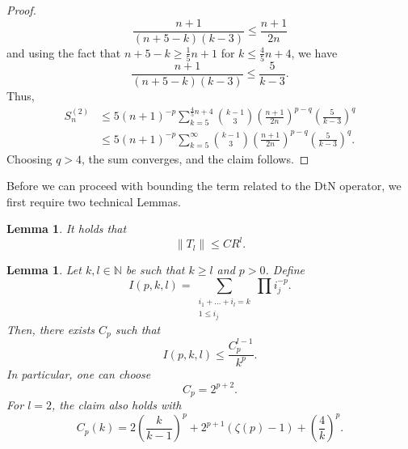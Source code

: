 \documentclass[a4paper,reqno,twoside]{amsart}
\numberwithin{equation}{section}
\newtheorem{lemma}[theorem]{Lemma}
\theoremstyle{definition}
\newcommand{\<}{\ensuremath \leq}
\renewcommand{\>}{\ensuremath \geq}
\begin{document}
\begin{proof}
    \begin{equation}
    \frac{n+1}{(n+5-k)(k-3)}\leq\frac{n+1}{2n}
    \end{equation}
    and using the fact that $n+5-k\geq \frac{1}{5}n+1$ for $k\leq \frac{4}{5}n+4$, we have
    \begin{equation}
       \frac{n+1}{(n+5-k)(k-3)}\leq \frac{5}{k-3}.
    \end{equation}
    Thus,
    \begin{equation}
        \begin{aligned}
                        S_n^{(2)}&\leq 5 (n+1)^{-p} \sum_{k=5}^{\frac{4}{5}n+4}
              \binom{k-1}{3} \left( \frac{n+1}{2n} \right)^{p-q}
              \left( \frac{5}{k-3} \right)^{q} \\
            &\leq 5 (n+1)^{-p} \sum_{k=5}^{\infty}
              \binom{k-1}{3} \left( \frac{n+1}{2n} \right)^{p-q}
              \left( \frac{5}{k-3} \right)^{q}.
        \end{aligned}
    \end{equation}
    Choosing $q >4$, the sum converges, and the claim follows.
\end{proof}

Before we can proceed with bounding the term related to the DtN operator, we first require two technical Lemmas. 
\begin{lemma}\label{lem:DtN_decay}
    It holds that
    \begin{equation}
        \lVert T_l \rVert \leq C R^l.
    \end{equation}
\end{lemma}

\begin{lemma}\label{lem:sum}
    Let $k,l \in \mathbb{N}$ be such that $k\geq l$ and $p>0$. Define
    \begin{equation}
        I(p,k,l) = \sum_{\substack{i_1+\dots+i_l=k\\1\leq i_j}}\prod i_j^{-p}.
    \end{equation}
    Then, there exists $C_p$ such that
    \begin{equation}
        I(p,k,l) \leq \frac{C_p^{l-1}}{k^p}.
    \end{equation}
    In particular, one can choose
    \begin{equation}
        C_p = 2^{p+2}.
    \end{equation}
    For $l=2$, the claim also holds with
    \begin{equation}
        C_p(k) = 2\left(\frac{k}{k-1}\right)^p + 2^{p+1}(\zeta(p)-1) + \left(\frac{4}{k}\right)^p.
    \end{equation}
\end{lemma}
\end{document}
